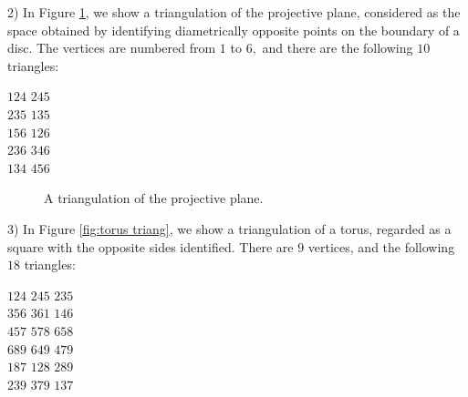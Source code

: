 \documentclass{article}
\theoremstyle{definition}
\begin{document}
2) In Figure \ref{fig:pplane triang}, we show a triangulation of the projective plane, considered as the space obtained by identifying diametrically opposite points on the boundary of a disc. The vertices are numbered from $1$ to $6,$ and there are the following $10$ triangles:
\begin{center}
  $124$ \hfil $245$\\
  $235$ \hfil $135$\\
  $156$ \hfil $126$\\
  $236$ \hfil $346$\\
  $134$ \hfil $456$
\end{center}

\begin{figure}[!htb]
  \centering
  
  \caption{A triangulation of the projective plane.}
  \label{fig:pplane triang}
\end{figure}

3) In Figure \ref{fig:torus triang}, we show a triangulation of a torus, regarded as a square with the opposite sides identified. There are $9$ vertices, and the following $18$ triangles:
\begin{center}
  $124$ \hfil $245$ \hfil $235$\\
  $356$ \hfil $361$ \hfil $146$\\
  $457$ \hfil $578$ \hfil $658$\\
  $689$ \hfil $649$ \hfil $479$\\
  $187$ \hfil $128$ \hfil $289$\\
  $239$ \hfil $379$ \hfil $137$\\
\end{center}
\end{document}
